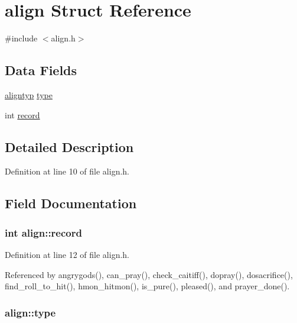\hypertarget{structalign}{\section{align Struct Reference}
\label{structalign}
}


{\ttfamily \#include $<$align.\+h$>$}

\subsection*{Data Fields}
\begin{DoxyCompactItemize}
\item 
\hyperlink{align_8h_a3e17b7a656899892e425fc89481aa2ab}{aligntyp} \hyperlink{structalign_a0dadfa91b9ff06447f91ea8a2b898827}{type}
\item 
int \hyperlink{structalign_ab3a768425270c33f059e3ead817e4e83}{record}
\end{DoxyCompactItemize}


\subsection{Detailed Description}


Definition at line 10 of file align.\+h.



\subsection{Field Documentation}
\hypertarget{structalign_ab3a768425270c33f059e3ead817e4e83}{
\subsubsection[{record}]{\setlength{\rightskip}{0pt plus 5cm}int align\+::record}}\label{structalign_ab3a768425270c33f059e3ead817e4e83}


Definition at line 12 of file align.\+h.



Referenced by angrygods(), can\+\_\+pray(), check\+\_\+caitiff(), dopray(), dosacrifice(), find\+\_\+roll\+\_\+to\+\_\+hit(), hmon\+\_\+hitmon(), is\+\_\+pure(), pleased(), and prayer\+\_\+done().

\hypertarget{structalign_a0dadfa91b9ff06447f91ea8a2b898827}{
\subsubsection[{type}]{ align\+::type}}\label{structalign_a0dadfa91b9ff06447f91ea8a2b898827}


